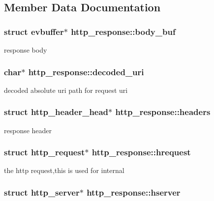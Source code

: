 \subsection{Member Data Documentation}
\hypertarget{structhttp__response_ae6bece88a820ee5637ccd2fa7d4b76d4}{
\subsubsection[{body\_\-buf}]{\setlength{\rightskip}{0pt plus 5cm}struct {\bf evbuffer}$\ast$ {\bf http\_\-response::body\_\-buf}}}
\label{structhttp__response_ae6bece88a820ee5637ccd2fa7d4b76d4}
response body \hypertarget{structhttp__response_aa39db72fcbd5259b1a8de73b7ce46b47}{
\subsubsection[{decoded\_\-uri}]{\setlength{\rightskip}{0pt plus 5cm}char$\ast$ {\bf http\_\-response::decoded\_\-uri}}}
\label{structhttp__response_aa39db72fcbd5259b1a8de73b7ce46b47}
decoded absolute uri path for request uri \hypertarget{structhttp__response_a5f7a1145407d477dd6e1f7a65a3dc60f}{
\subsubsection[{headers}]{\setlength{\rightskip}{0pt plus 5cm}struct http\_\-header\_\-head$\ast$ {\bf http\_\-response::headers}}}
\label{structhttp__response_a5f7a1145407d477dd6e1f7a65a3dc60f}
response header \hypertarget{structhttp__response_af09ef4d96665428d0499b1c4679f5f9a}{
\subsubsection[{hrequest}]{\setlength{\rightskip}{0pt plus 5cm}struct {\bf http\_\-request}$\ast$ {\bf http\_\-response::hrequest}}}
\label{structhttp__response_af09ef4d96665428d0499b1c4679f5f9a}
the http request,this is used for internal \hypertarget{structhttp__response_a762a56e397857a5f649ad151474daad5}{
\subsubsection[{hserver}]{\setlength{\rightskip}{0pt plus 5cm}struct {\bf http\_\-server}$\ast$ {\bf http\_\-response::hserver}}}
